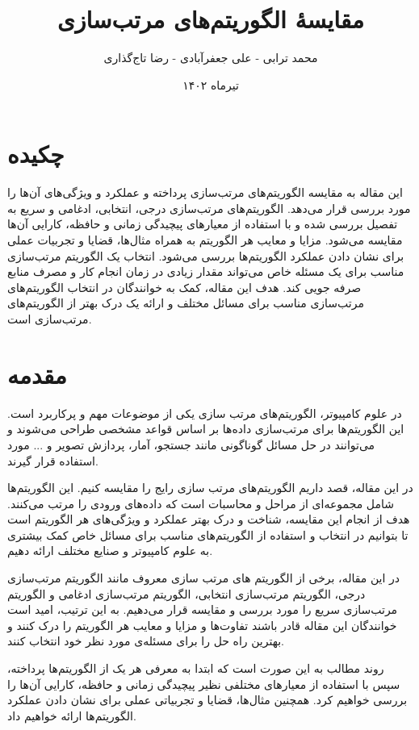 \documentclass[12pt]{article}
\title{مقایسهٔ الگوریتم‌های مرتب‌سازی}
\author{محمد ترابی - علی جعفر‌آبادی - رضا تاج‌گذاری}
\date{تیرماه ۱۴۰۲}
\begin{document}
\maketitle


\section*{چکیده}
این مقاله به مقایسه الگوریتم‌های مرتب‌سازی پرداخته و عملکرد و ویژگی‌های آن‌ها را مورد بررسی قرار می‌دهد. الگوریتم‌های مرتب‌سازی درجی، انتخابی، ادغامی و سریع به تفصیل بررسی شده و با استفاده از معیارهای پیچیدگی زمانی و حافظه، کارایی آن‌ها مقایسه می‌شود. مزایا و معایب هر الگوریتم به همراه مثال‌ها، قضایا و تجربیات عملی برای نشان دادن عملکرد الگوریتم‌ها بررسی می‌شود. انتخاب یک الگوریتم مرتب‌سازی مناسب برای یک مسئله خاص می‌تواند مقدار زیادی در زمان انجام کار و مصرف منابع صرفه جویی کند. هدف این مقاله، کمک به خوانندگان در انتخاب الگوریتم‌های مرتب‌سازی مناسب برای مسائل مختلف و ارائه یک درک بهتر از الگوریتم‌های مرتب‌سازی است.

\pagebreak

\setcounter{section}{-1} 

\section{مقدمه}
در علوم کامپیوتر، الگوریتم‌های مرتب سازی یکی از موضوعات مهم و پرکاربرد است. این الگوریتم‌ها برای مرتب‌سازی داده‌ها بر اساس قواعد مشخصی طراحی می‌شوند و می‌توانند در حل مسائل گوناگونی مانند جستجو، آمار، پردازش تصویر و ... مورد استفاده قرار گیرند.

در این مقاله، قصد داریم الگوریتم‌های مرتب سازی رایج را مقایسه کنیم. این الگوریتم‌ها شامل مجموعه‌ای از مراحل و محاسبات است که داده‌های ورودی را مرتب می‌کنند. هدف از انجام این مقایسه، شناخت و درک بهتر عملکرد و ویژگی‌های هر الگوریتم است تا بتوانیم در انتخاب و استفاده از الگوریتم‌های مناسب برای مسائل خاص کمک بیشتری به علوم کامپیوتر و صنایع مختلف ارائه دهیم.

در این مقاله، برخی از الگوریتم های مرتب سازی معروف
مانند الگوریتم مرتب‌سازی درجی، الگوریتم مرتب‌سازی انتخابی، الگوریتم مرتب‌سازی ادغامی و الگوریتم مرتب‌سازی سریع را مورد بررسی و مقایسه قرار می‌دهیم.
به این ترتیب، امید است خوانندگان این مقاله قادر باشند تفاوت‌ها و مزایا و معایب هر الگوریتم را درک کنند و بهترین راه حل را برای مسئله‌ی مورد نظر خود انتخاب کنند.

روند مطالب به این صورت است که ابتدا به معرفی هر یک از الگوریتم‌ها پرداخته، سپس با استفاده از معیارهای مختلفی نظیر پیچیدگی زمانی و حافظه، کارایی آن‌ها را بررسی خواهیم کرد. همچنین مثال‌ها، قضایا و تجربیاتی عملی برای نشان دادن عملکرد الگوریتم‌ها ارائه خواهیم داد.
\end{document}
